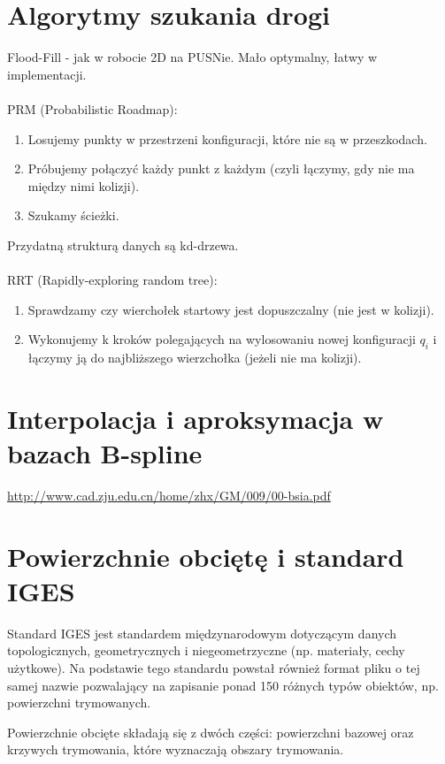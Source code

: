 \documentclass[12pt]{article}
\begin{document}
 \section{Algorytmy szukania drogi}
 Flood-Fill - jak w robocie 2D na PUSNie. Mało optymalny, łatwy w implementacji. \\
 ~\\
 PRM (Probabilistic Roadmap):
 \begin{enumerate}
 	\item Losujemy punkty w przestrzeni konfiguracji, które nie są w przeszkodach.
 	\item Próbujemy połączyć każdy punkt z każdym (czyli łączymy, gdy nie ma między nimi kolizji).
 	\item Szukamy ścieżki.
 \end{enumerate} 
Przydatną strukturą danych są kd-drzewa.\\
~\\
RRT (Rapidly-exploring random tree):
\begin{enumerate}
	\item Sprawdzamy czy wierchołek startowy jest dopuszczalny (nie jest w kolizji).
	\item Wykonujemy k kroków polegających na wylosowaniu nowej konfiguracji $q_{i}$ i łączymy ją do najbliższego wierzchołka (jeżeli nie ma kolizji).
\end{enumerate} 
 
\setcounter{section}{34}
\section{Interpolacja i aproksymacja w bazach B-spline}
\hyperlink{Prezentacja}{http://www.cad.zju.edu.cn/home/zhx/GM/009/00-bsia.pdf} 


\section{Powierzchnie obciętę i standard IGES}
Standard IGES jest standardem międzynarodowym dotyczącym danych topologicznych, geometrycznych i niegeometrzyczne (np. materiały, cechy użytkowe). Na podstawie tego standardu powstał również format pliku o tej samej nazwie pozwalający na zapisanie ponad 150 różnych typów obiektów, np. powierzchni trymowanych.

Powierzchnie obcięte składają się z dwóch części: powierzchni bazowej oraz krzywych trymowania, które wyznaczają obszary trymowania.
\end{document}
